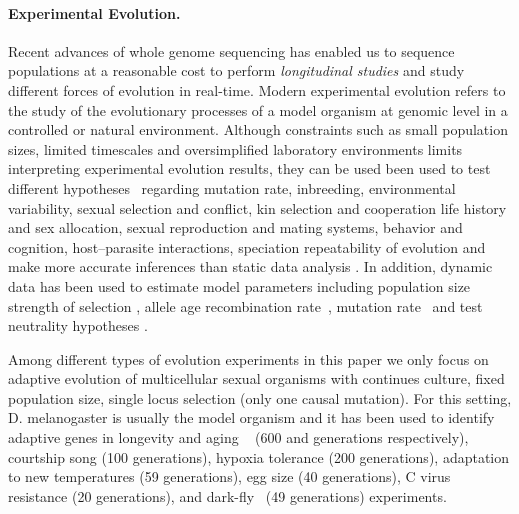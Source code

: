 \documentclass[11pt]{article}
\begin{document}
\paragraph{Experimental Evolution.}
Recent advances of whole genome sequencing has enabled us to sequence 
populations at a reasonable cost to perform \emph{longitudinal studies} and  study different forces of evolution in real-time. Modern experimental 
evolution refers to the study of the evolutionary processes of a model organism 
at genomic level in a 
controlled  
\cite{hegreness2006equivalence,lang2013pervasive,orozco2012adaptation,
	lang2011genetic,barrick2009genome,bollback2007clonal,oz2014strength} 
or natural 
\cite{maldarelli2013hiv,reid2011new,denef2012situ,winters2012development,
	daniels2013genetic,barrett2008natural,bergland2014genomic} environment.
Although constraints such as small population sizes, limited 
timescales and oversimplified laboratory
environments limits interpreting experimental evolution results, they can 
be used
been used to test different hypotheses~\cite{kawecki2012experimental}
regarding
mutation rate, 
inbreeding, 
environmental variability,
sexual selection and conflict, 
kin selection and cooperation
life history and sex allocation, 
sexual reproduction and mating systems, 
behavior and cognition, 
host–parasite interactions, 
speciation repeatability of evolution 
and make more accurate inferences 
than static data analysis 
\cite{boyko2008assessing,desai2008polymorphism,sawyer1992population}. In 
addition, dynamic data has been used to estimate model parameters 
including population size
\cite{williamson1999using,wang2001pseudo,pollak1983new,waples1989generalized,
	Terhorst2015Multi}
strength of selection
\cite{mathieson2013estimating,illingworth2011distinguishing,Terhorst2015Multi,
	bollback2008estimation,illingworth2012quantifying,malaspinas2012estimating,
	Steinrücken2014a}, allele age
\cite{malaspinas2012estimating}
recombination rate~\cite{Terhorst2015Multi}, mutation
rate~\cite{Barrick2013Genome, Terhorst2015Multi} and test neutrality hypotheses 
\cite{feder2014Identifying,Terhorst2015Multi,burke2010genome,bergland2014genomic}.

Among different types of evolution experiments 
\cite{Barrick2013Genome,schlotterer2015combining} in 
this 
paper we only focus on adaptive evolution of multicellular sexual organisms 
with 
continues culture, fixed population size, single locus selection (only one 
causal mutation). 
For this setting, D. melanogaster is 
usually the model organism and it has been used to identify adaptive genes in 
longevity and aging ~\cite{burke2010genome,remolina2012genomic} (600 and  
generations respectively),
courtship song \cite{turner2011population} (100 generations),
hypoxia tolerance \cite{zhou2011experimental} (200 generations),
adaptation to new temperatures\cite{orozco2012adaptation,tobler2014massive} (59 
generations),
egg size \cite{jha2015whole} (40 generations),
C virus resistance \cite{martins2014host} (20 generations),
and dark-fly~\cite{izutsu2015dynamics} (49 generations) experiments.
\end{document}
